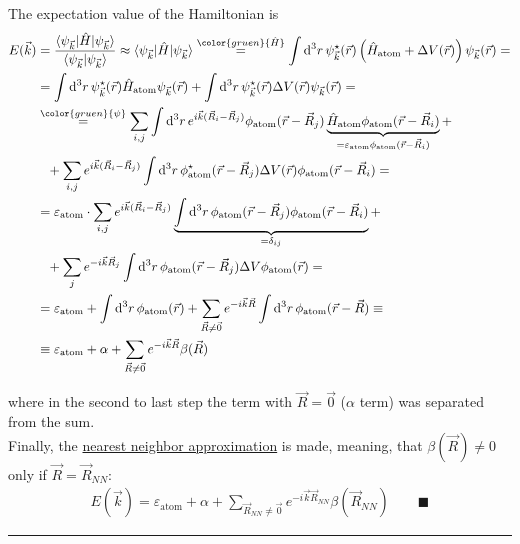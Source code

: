 \documentclass{article}
\newcommand{\diff}{\mathrm{d}}
\newcommand{\lr}[1]{\left(#1\right)}
\newcommand{\comment}[1]{{\color{gruen} {#1}}}
\begin{document}
{The expectation value of the Hamiltonian is
	\begin{align*}
		E(\vec{k}) &= \frac{ \braket{ \psi_{\vec{k}} | \hat{H} | \psi_{\vec{k}} } }{ \braket{\psi_{\vec{k}} | \psi_{\vec{k}} } } \approx \braket{ \psi_{\vec{k}} | \hat{H} | \psi_{\vec{k}} } \stackrel{ \comment{ \hat{H} } }{=} \int \diff^3r \, \psi_{\vec{k}}^\star(\vec{r}) \lr{ \hat{H}_\text{atom} + \Delta V(\vec{r}) } \psi_{\vec{k}}(\vec{r}) = \\
		&= \int \diff^3r \, \psi_{\vec{k}}^\star(\vec{r}) \hat{H}_\text{atom} \psi_{\vec{k}}(\vec{r}) + \int \diff^3r \, \psi_{\vec{k}}^\star(\vec{r}) \Delta V(\vec{r}) \psi_{\vec{k}}(\vec{r}) = \\
		&\stackrel{\comment{\psi}}{=} \sum_{i,j} \int \diff^3r \, e^{i\vec{k}(\vec{R}_i - \vec{R}_j)} \phi_\text{atom}(\vec{r} - \vec{R}_j) \underbrace{ \hat{H}_\text{atom} \phi_\text{atom}(\vec{r} - \vec{R}_i) }_{= \varepsilon_\text{atom} \phi_\text{atom}(\vec{r} - \vec{R}_i)} + \\
		&\phantom{=} + \sum_{i,j} e^{i\vec{k}(\vec{R}_i - \vec{R}_j)} \int \diff^3r \, \phi_\text{atom}^\star(\vec{r} - \vec{R}_j) \Delta V(\vec{r}) \phi_\text{atom}(\vec{r} - \vec{R}_i) = \\
		&= \varepsilon_\text{atom} \cdot \sum_{i,j} e^{i\vec{k}(\vec{R}_i - \vec{R}_j)} \underbrace{ \int \diff^3r \, \phi_\text{atom}(\vec{r} - \vec{R}_j) \phi_\text{atom}(\vec{r} - \vec{R}_i) }_{ =\delta_{ij} } + \\
		&\phantom{=} + \sum_j e^{-i\vec{k}\vec{R}_j} \int \diff^3r \, \phi_\text{atom}(\vec{r} - \vec{R}_j) \Delta V \phi_\text{atom}(\vec{r}) = \\
		&= \varepsilon_\text{atom} + \int \diff^3r \, \phi_\text{atom}(\vec{r}) + \sum_{\vec{R}\neq \vec{0}} e^{-i\vec{k}\vec{R}} \int \diff^3r \, \phi_\text{atom}(\vec{r} - \vec{R}) \equiv \\
		&\equiv \varepsilon_\text{atom} + \alpha + \sum_{\vec{R}\neq \vec{0}} e^{-i\vec{k}\vec{R}} \beta(\vec{R})
	\end{align*}

where in the second to last step the term with $\vec{R} = \vec{0}$ ($\alpha$ term) was separated from the sum.\\
Finally, the \underline{nearest neighbor approximation} is made, meaning, that $\beta(\vec{R}) \neq 0$ only if $\vec{R} = \vec{R}_{NN}$:
	\begin{align*}
		E(\vec{k}) = \varepsilon_\text{atom} + \alpha + \sum_{\vec{R}_{NN}\neq \vec{0}} e^{-i\vec{k}\vec{R}_{NN}} \beta(\vec{R}_{NN}) \qquad \blacksquare
	\end{align*}

\hrule
}
\end{document}
